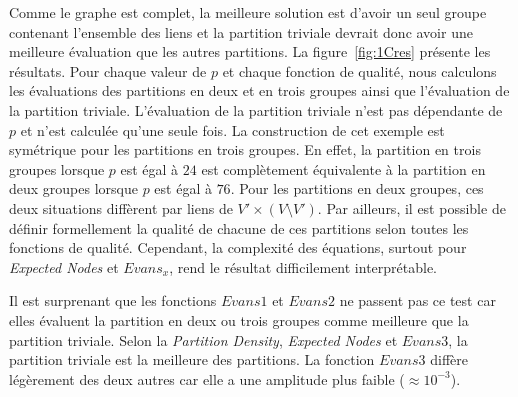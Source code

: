 Comme le graphe est complet, la meilleure solution est d'avoir un seul groupe contenant l'ensemble des liens et la partition triviale devrait donc avoir une meilleure évaluation que les autres partitions.
La figure~\ref{fig:1Cres} présente les résultats.
Pour chaque valeur de $p$ et chaque fonction de qualité, nous calculons les évaluations des partitions en deux et en trois groupes ainsi que l'évaluation de la partition triviale.
L'évaluation de la partition triviale n'est pas dépendante de $p$ et n'est calculée qu'une seule fois.
La construction de cet exemple est symétrique pour les partitions en trois groupes.
En effet, la partition en trois groupes lorsque $p$ est égal à $24$ est complètement équivalente à la partition en deux groupes lorsque $p$ est égal à $76$.
Pour les partitions en deux groupes, ces deux situations diffèrent par liens de $V' \times (V\setminus V')$.
Par ailleurs, il est possible de définir formellement la qualité de chacune de ces partitions selon toutes les fonctions de qualité.
Cependant, la complexité des équations, surtout pour \emph{Expected Nodes} et $Evans_x$, rend le résultat difficilement interprétable.


Il est surprenant que les fonctions $Evans1$ et $Evans2$ ne passent pas ce test car elles évaluent la partition en deux ou trois groupes comme meilleure que la partition triviale.
Selon la \emph{Partition Density}, \emph{Expected Nodes} et $Evans3$, la partition triviale est la meilleure des partitions.
La fonction $Evans3$ diffère légèrement des deux autres car elle a une amplitude plus faible ($\approx 10^{-3}$).


